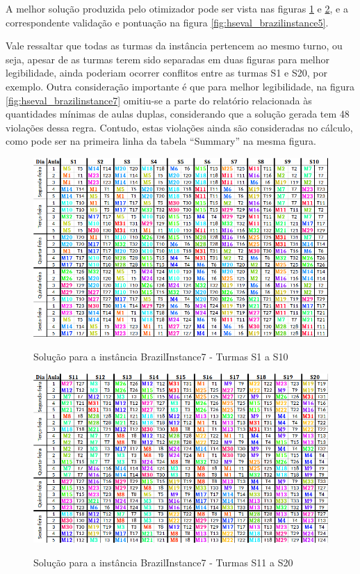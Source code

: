 \newpage
A melhor solução produzida pelo otimizador pode ser vista nas figuras \ref{fig:brazilinstance7_solucao} e \ref{fig:brazilinstance7_solucao_2}, e a correspondente validação e pontuação na figura \ref{fig:hseval_brazilinstance5}.

Vale ressaltar que todas as turmas da instância pertencem ao mesmo turno, ou seja, apesar de as turmas terem sido separadas em duas figuras para melhor legibilidade, ainda poderiam ocorrer conflitos entre as turmas S1 e S20, por exemplo. Outra consideração importante é que para melhor legibilidade, na figura \ref{fig:hseval_brazilinstance7} omitiu-se a parte do relatório relacionada às quantidades mínimas de aulas duplas, considerando que a solução gerada tem 48 violações dessa regra. Contudo, estas violações ainda são consideradas no cálculo, como pode ser na primeira linha da tabela ``Summary'' na mesma figura.

\begin{figure}[h]
	\centering
	\caption{Solução para a instância BrazilInstance7 - Turmas S1 a S10}
	\includegraphics[width=1\textwidth]{./dados/figuras/brazilinstance7}
	\label{fig:brazilinstance7_solucao}
\end{figure}

\begin{figure}[h]
	\centering
	\caption{Solução para a instância BrazilInstance7 - Turmas S11 a S20}
	\includegraphics[width=1\textwidth]{./dados/figuras/brazilinstance7_2}
	\label{fig:brazilinstance7_solucao_2}
\end{figure}


